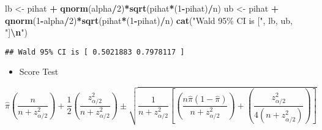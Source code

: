 \documentclass[
]{article}
\newenvironment{Shaded}{\begin{snugshade}}{\end{snugshade}}
\newcommand{\DecValTok}[1]{\textcolor[rgb]{0.00,0.00,0.81}{#1}}
\newcommand{\FunctionTok}[1]{\textcolor[rgb]{0.13,0.29,0.53}{\textbf{#1}}}
\newcommand{\NormalTok}[1]{#1}
\newcommand{\OtherTok}[1]{\textcolor[rgb]{0.56,0.35,0.01}{#1}}
\newcommand{\SpecialCharTok}[1]{\textcolor[rgb]{0.81,0.36,0.00}{\textbf{#1}}}
\newcommand{\StringTok}[1]{\textcolor[rgb]{0.31,0.60,0.02}{#1}}
\providecommand{\tightlist}{%
  \setlength{\itemsep}{0pt}\setlength{\parskip}{0pt}}
\begin{document}
\begin{Shaded}
\begin{Highlighting}[]
\NormalTok{lb }\OtherTok{\textless{}{-}}\NormalTok{ pihat }\SpecialCharTok{+} \FunctionTok{qnorm}\NormalTok{(alpha}\SpecialCharTok{/}\DecValTok{2}\NormalTok{)}\SpecialCharTok{*}\FunctionTok{sqrt}\NormalTok{(pihat}\SpecialCharTok{*}\NormalTok{(}\DecValTok{1}\SpecialCharTok{{-}}\NormalTok{pihat)}\SpecialCharTok{/}\NormalTok{n) }
\NormalTok{ub }\OtherTok{\textless{}{-}}\NormalTok{ pihat }\SpecialCharTok{+} \FunctionTok{qnorm}\NormalTok{(}\DecValTok{1}\SpecialCharTok{{-}}\NormalTok{alpha}\SpecialCharTok{/}\DecValTok{2}\NormalTok{)}\SpecialCharTok{*}\FunctionTok{sqrt}\NormalTok{(pihat}\SpecialCharTok{*}\NormalTok{(}\DecValTok{1}\SpecialCharTok{{-}}\NormalTok{pihat)}\SpecialCharTok{/}\NormalTok{n) }
\FunctionTok{cat}\NormalTok{(}\StringTok{"Wald 95\% CI is ["}\NormalTok{, lb, ub, }\StringTok{"]}\SpecialCharTok{\textbackslash{}n}\StringTok{"}\NormalTok{)}
\end{Highlighting}
\end{Shaded}

\begin{verbatim}
## Wald 95% CI is [ 0.5021883 0.7978117 ]
\end{verbatim}

\begin{itemize}
\tightlist
\item
  Score Test
\end{itemize}

\[
  \hat{\pi}\left(\frac{n}{n+z_{\alpha/2}^2}\right)+
  \frac{1}{2}\left(\frac{z_{\alpha/2}^2}{n+z_{\alpha/2}^2}\right)
  \pm\sqrt{\frac{1}{n+z_{\alpha/2}^2}\left[\left(\frac{n\hat{\pi}(1-\hat{\pi})}{n+z_{\alpha/2}^2}\right)+
  \left(\frac{z_{\alpha/2}^2}{4(n+z_{\alpha/2}^2)}\right)\right]}
\]
\end{document}
